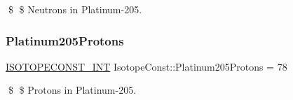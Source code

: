 \$ \$ Neutrons in Platinum-\/205. \mbox{\label{group___isotope_const-_platinum-_pt205_gadf377ce1d450102812317c5c2b5be723}} 
\subsubsection{\texorpdfstring{Platinum205\+Protons}{Platinum205Protons}}
{\footnotesize\ttfamily \mbox{\hyperlink{group___isotope_const-_macros_ga5f18360b3e99483a35c32d789e62621c}{I\+S\+O\+T\+O\+P\+E\+C\+O\+N\+S\+T\+\_\+\+I\+NT}} Isotope\+Const\+::\+Platinum205\+Protons = 78}

\$ \$ Protons in Platinum-\/205. 